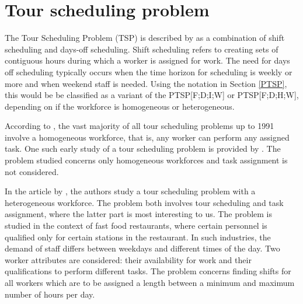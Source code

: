 
 

%
%
%
%


\section{Tour scheduling problem}\label{TSP}

The Tour Scheduling Problem (TSP) is described by \citet{loucks_1991} as a combination of shift scheduling and days-off scheduling. Shift scheduling refers to creating sets of contiguous hours during which a worker is assigned for work. The need for days off scheduling typically occurs when the time horizon for scheduling is weekly or more and when weekend staff is needed. Using the notation in Section \ref{PTSP}, this would be be classified as a variant of the PTSP[F;D;I;W] or PTSP[F;D;H;W], depending on if the workforce is homogeneous or heterogeneous.

According to \citet{loucks_1991}, the vast majority of all tour scheduling problems up to 1991 involve a homogeneous workforce, that is, any worker can perform any assigned task. One such early study of a tour scheduling problem is provided by \citet{thompson_1988}. The problem studied concerns only homogeneous workforces and task assignment is not considered.

In the article by \citet{loucks_1991}, the authors study a tour scheduling problem with a heterogeneous workforce. The problem both involves tour scheduling and task assignment, where the latter part is most interesting to us. The problem is studied in the context of fast food restaurants, where certain personnel is qualified only for certain stations in the restaurant. In such industries, the demand of staff differs between weekdays and different times of the day. Two worker attributes are considered: their availability for work and their qualifications to perform different tasks. The problem concerns finding shifts for all workers which are to be assigned a length between a minimum and maximum number of hours per day.

